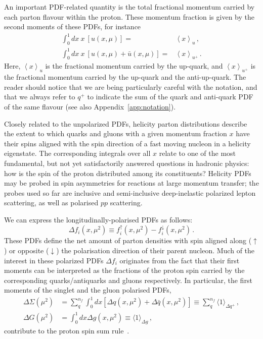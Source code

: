 An important PDF-related quantity is
the total fractional momentum carried
by each parton flavour within the proton.
%
These momentum fraction is
given by the second moments of these PDFs, for instance
%
\begin{align}
\int_{0}^{1}dx\ x\ \left[u(x,\mu)\right] = & {}  \left\langle x\right\rangle _{u}\,, \label{eq:umoment1}\\
\int_{0}^{1}dx\ x\ \left[u(x,\mu)+\bar{u}(x,\mu)\right] = & {} \left\langle x\right\rangle _{u^{+}}\,. \label{eq:uplusmoment1}
\end{align}
%
Here, $\left\langle x\right\rangle _{u}$ is the fractional momentum
carried by the up-quark, and $\left\langle x\right\rangle _{u^{+}}$ is
the fractional momentum carried by the up-quark and the
anti-up-quark.
%
The reader should notice that we are being particularly careful
with the notation, and that we always refer to $q^+$ to indicate
the sum of the quark and anti-quark PDF of the same flavour (see
also Appendix~\ref{app:notation}).

Closely related to the unpolarized PDFs,
helicity parton distributions describe the extent to which quarks and gluons 
with a given momentum fraction $x$ have their spins aligned with the spin 
direction of a fast moving nucleon in a helicity eigenstate. 
%
The corresponding integrals over all $x$ relate to one of the most fundamental, 
but not yet satisfactorily answered questions in hadronic physics: 
how is the spin of the proton distributed among its constituents? 
%
Helicity PDFs may be probed in spin asymmetries for reactions at large momentum 
transfer; the probes used so far are inclusive and semi-inclusive 
deep-inelastic polarized lepton scattering, as well as polarised $pp$ scattering.

We can express the
longitudinally-polarised PDFs as follows:
\begin{equation}
\Delta f_i(x,\mu^2) \equiv f_i^{\uparrow}(x,\mu^2) - f_i^{\downarrow}(x,\mu^2)\,.
\label{eq:polPDFs}
\end{equation}
These PDFs define the net amount of parton 
densities with spin aligned along ($\uparrow$) or opposite ($\downarrow$)
the polarisation direction of their parent nucleon.
%
Much of the interest in these polarized
PDFs $\Delta f_i$ originates from the fact that their 
first moments can be interpreted as the fractions of the proton spin 
carried by the corresponding quarks/antiquarks and gluons respectively.
%
In particular,
the first moments of the singlet and the gluon polarised PDFs,
\begin{align}
\Delta\Sigma(\mu^2)
& =
\sum_{q}^{n_f}\int_0^1 dx 
\left[\Delta q(x, \mu^2) + \Delta\bar{q}(x, \mu^2)\right]
\equiv
\sum_q^{n_f}\langle 1 \rangle_{\Delta q^+}\,,
\\
\Delta G(\mu^2)
& =
\int_0^1 dx \Delta g(x,\mu^2)
\equiv
\langle 1 \rangle_{\Delta g}
\,,
\label{eq:moments}
\end{align}
contribute to the proton spin sum rule~\cite{Leader:2013jra}.
%

